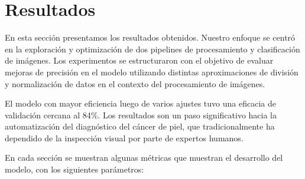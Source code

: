 \chapter{Resultados}\label{chapter:results}

En esta sección presentamos los resultados obtenidos. Nuestro enfoque se centró en la exploración y optimización de dos pipelines de procesamiento y clasificación de imágenes. Los experimentos se estructuraron con el objetivo de evaluar mejoras de precisión en el modelo utilizando distintas aproximaciones de división y normalización de datos en el contexto del procesamiento de imágenes.

El modelo con mayor eficiencia luego de varios ajustes tuvo una eficacia de validación cercana al 84\%. Los resultados son un paso significativo hacia la automatización del diagnóstico del cáncer de piel, que tradicionalmente ha dependido de la inspección visual por parte de expertos humanos. 

En cada sección se muestran algunas métricas que muestran el desarrollo del modelo, con los siguientes parámetros:

